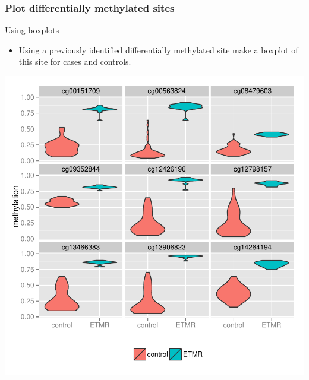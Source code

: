 \documentclass[10pt]{beamer}
\newenvironment{xframe}[2][]
  {\begin{frame}[fragile,environment=xframe,#1]
  \frametitle{#2}}
  {\end{frame}}
\begin{document}

\begin{xframe}{Plot differentially methylated sites}
  \begin{block}{Using boxplots}
    \begin{itemize}
      \item Using a previously identified differentially methylated site make a
      boxplot of this site for {\sf cases} and {\sf controls}.
    \end{itemize}
  \end{block}
  
  \centering
  \includegraphics[height=.6\textheight,page=4]{imgs/example-ggplot2.pdf}
  
\end{xframe}

\end{document}
